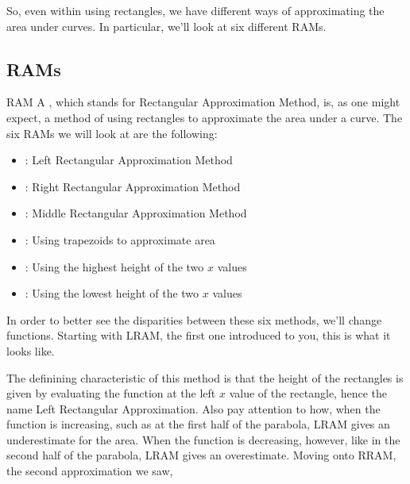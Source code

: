 So, even within using rectangles, we have different ways of approximating the area under curves. In particular, we'll look at six different RAMs.

\subsection{RAMs}

\begin{definition}{RAM}
    A , which stands for Rectangular Approximation Method, is, as one might expect, a method of using rectangles to approximate the area under a curve. The six RAMs we will look at are the following:

    \begin{multicols}{2}
        \begin{itemize}
            \item {}: Left Rectangular Approximation Method
            \item {}: Right Rectangular Approximation Method
            \item {}: Middle Rectangular Approximation Method
            \item {}: Using trapezoids to approximate area
            \item {}: Using the highest height of the two \( x \) values
            \item {}: Using the lowest height of the two \( x \) values
        \end{itemize}
    \end{multicols}
\end{definition}

In order to better see the disparities between these six methods, we'll change functions. Starting with LRAM, the first one introduced to you, this is what it looks like.

\begin{figure}[H]
    \centering
    
\end{figure}

The definining characteristic of this method is that the height of the rectangles is given by evaluating the function at the left \( x \) value of the rectangle, hence the name Left Rectangular Approximation. Also pay attention to how, when the function is increasing, such as at the first half of the parabola, LRAM gives an underestimate for the area. When the function is decreasing, however, like in the second half of the parabola, LRAM gives an overestimate. Moving onto RRAM, the second approximation we saw,


